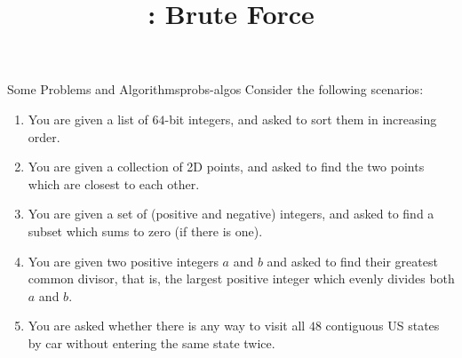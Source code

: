 \documentclass{tufte-handout}
\title{\thecourse: Brute Force}
\date{}
\begin{document}
\maketitle

\begin{model}{Some Problems and Algorithms}{probs-algos}
Consider the following scenarios:

\begin{enumerate}[label=(\alph*)]
\item You are given a list of $64$-bit integers, and asked to sort
  them in increasing order.
\item You are given a collection of 2D points, and asked to find the
  two points which are closest to each other.
\item You are given a set of (positive and negative)
  integers, and asked to find a subset which sums to zero (if there is
  one).
\item You are given two positive integers $a$ and $b$ and asked to
  find their greatest common divisor, that is, the largest positive
  integer which evenly divides both $a$ and $b$.
\item You are asked whether there is any way to visit all $48$
  contiguous US states by car without entering the same state twice.
\end{enumerate}


\end{model}
\end{document}
